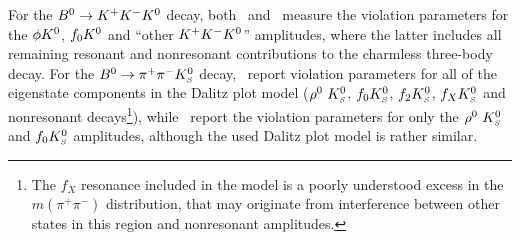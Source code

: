 For the $B^0 \to K^+K^-K^0$ decay, both \babar\ and \belle\ measure the \CP
violation parameters for the $\phi K^0$, $f_0K^0$ and ``other $K^+K^-K^0$''
amplitudes, where the latter includes all remaining resonant and nonresonant
contributions to the charmless three-body decay.
For the $B^0 \to \pi^+\pi^-K^0_{\scriptscriptstyle S}$ decay, \babar\ report \CP violation parameters
for all of the \CP eigenstate components in the Dalitz plot model ($\rho^0\hbox{ }K^0_{\scriptscriptstyle S}$,
$f_0K^0_{\scriptscriptstyle S}$, $f_2K^0_{\scriptscriptstyle S}$, $f_XK^0_{\scriptscriptstyle S}$ and nonresonant decays\footnote{
  The $f_X$ resonance included in the model is a poorly understood excess in
  the $m(\pi^+\pi^-)$ distribution, that may originate from interference
  between other states in this region and nonresonant amplitudes.
}), while \belle\ report the
\CP violation parameters for only the $\rho^0\hbox{ }K^0_{\scriptscriptstyle S}$ and $f_0K^0_{\scriptscriptstyle S}$ amplitudes,
although the used Dalitz plot model is rather similar.




